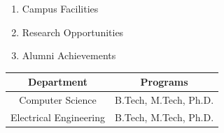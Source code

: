 \documentclass{article}
\begin{document}
\begin{enumerate}
    \item Campus Facilities
    \item Research Opportunities
    \item Alumni Achievements
\end{enumerate}

\begin{tabular}{|c|c|}
    \hline
    Department & Programs \\
    \hline
    Computer Science & B.Tech, M.Tech, Ph.D. \\
    Electrical Engineering & B.Tech, M.Tech, Ph.D. \\
    \hline
\end{tabular}
\end{document}
